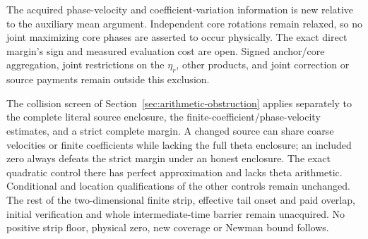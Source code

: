 The acquired phase-velocity and coefficient-variation information is
new relative to the auxiliary mean argument. Independent core rotations
remain relaxed, so no joint maximizing core phases are asserted to occur
physically. The exact direct margin's sign and measured evaluation cost
are open. Signed anchor/core aggregation, joint restrictions on the
$\eta_r$, other products, and joint correction or source payments remain
outside this exclusion.

The collision screen of Section~\ref{sec:arithmetic-obstruction}
applies separately to the complete literal source enclosure, the
finite-coefficient/phase-velocity estimates, and a strict complete
margin. A changed source can share coarse velocities or finite
coefficients while lacking the full theta enclosure; an included zero
always defeats the strict margin under an honest enclosure.
The exact quadratic control there has perfect approximation and lacks
theta arithmetic. Conditional and location qualifications of the other
controls remain unchanged. The rest of the two-dimensional finite
strip, effective tail onset and paid overlap, initial verification and
whole intermediate-time barrier remain unacquired. No positive strip
floor, physical zero, new coverage or Newman bound follows.
